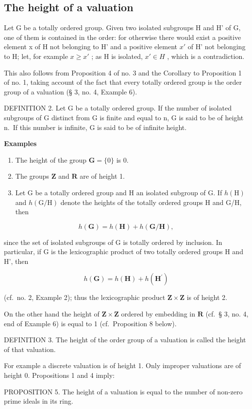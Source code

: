 \subsection{The height of a valuation}

Let G be a totally ordered group. Given two isolated subgroups H and H' of G, one of them is contained in the order: for otherwise there would exist a positive element x of H not belonging to H' and a positive element \(x'\) of H' not belonging to H; let, for example \(x \geqslant x'\) ; as H is isolated, \(x' \in H\) , which is a contradiction.

This also follows from Proposition 4 of no. 3 and the Corollary to Proposition 1 of no. 1, taking account of the fact that every totally ordered group is the order group of a valuation (§ 3, no. 4, Example 6).

DEFINITION 2. Let G be a totally ordered group. If the number of isolated subgroups of G distinct from G is finite and equal to n, G is said to be of height n.~If this number is infinite, G is said to be of infinite height.

\textbf{Examples}\par

\begin{enumerate}
\def\labelenumi{(\arabic{enumi})}
\item
  The height of the group \(\mathbf{G} = \{0\}\) is 0.
\item
  The groups \(\mathbf{Z}\) and \(\mathbf{R}\) are of height 1.
\item
  Let G be a totally ordered group and H an isolated subgroup of G. If \(h(\mathrm{H})\) and \(h(\mathrm{G}/\mathrm{H})\) denote the heights of the totally ordered groups H and G/H, then
\end{enumerate}

\[
h (\mathbf {G}) = h (\mathbf {H}) + h (\mathbf {G} / \mathbf {H}),\tag{2}
\]

since the set of isolated subgroups of G is totally ordered by inclusion. In particular, if G is the lexicographic product of two totally ordered groups H and H', then

\[
h (\mathbf {G}) = h (\mathbf {H}) + h \left(\mathbf {H} ^ {\prime}\right)\tag{3}
\]

(cf.~no. 2, Example 2); thus the lexicographic product \(\mathbf{Z} \times \mathbf{Z}\) is of height 2.

On the other hand the height of \(\mathbf{Z} \times \mathbf{Z}\) ordered by embedding in \(\mathbf{R}\) (cf.~§ 3, no. 4, end of Example 6) is equal to 1 (cf.~Proposition 8 below).

DEFINITION 3. The height of the order group of a valuation is called the height of that valuation.

For example a discrete valuation is of height 1. Only improper valuations are of height 0. Propositions 1 and 4 imply:

PROPOSITION 5. The height of a valuation is equal to the number of non-zero prime ideals in its ring.

